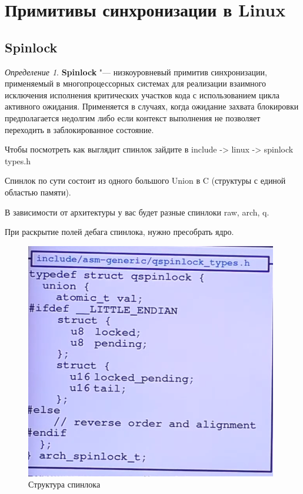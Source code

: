 \documentclass[bachelor, och, book]{SCWorks}
\theoremstyle{remark}
\newtheorem{definition}{Определение}
\begin{document}
    \section{Примитивы синхронизации в Linux}

    \subsection{Spinlock}

    \begin{definition}
        \textbf{Spinlock} "--- низкоуровневый примитив синхронизации, применяемый в многопроцессорных системах для реализации взаимного исключения исполнения критических участков кода с использованием цикла активного ожидания. Применяется в случаях, когда ожидание захвата блокировки предполагается недолгим либо если контекст выполнения не позволяет переходить в заблокированное состояние.
    \end{definition}

    Чтобы посмотреть как выглядит спинлок зайдите в include -> linux -> spinlock types.h

    Спинлок по сути состоит из одного большого Union в C (структуры с единой областью памяти).

    В зависимости от архитектуры у вас будет разные спинлоки raw, arch, q.

    При раскрытие полей дебага спинлока, нужно пресобрать ядро.

    \begin{figure}[H]
        \begin{center}
            \includegraphics[scale=0.60]{res/structure-spinlock.png}
            \caption{Структура спинлока}
        \end{center}
    \end{figure}
\end{document}
